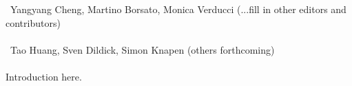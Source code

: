 

~Yangyang Cheng, Martino Borsato, Monica Verducci (...fill in other editors and contributors)\\
\text{ \; }\\
~Tao Huang, Sven Dildick, Simon Knapen (others forthcoming)\\
\text{ \; }\\

\noindent Introduction here.





